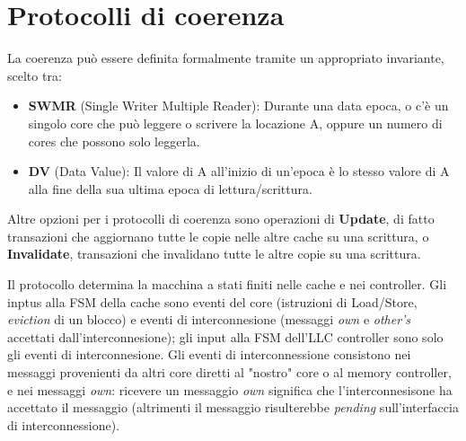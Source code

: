 \section{Protocolli di coerenza}
La coerenza può essere definita formalmente tramite un appropriato invariante, scelto tra:

\begin{itemize}
    \item \textbf{SWMR} (Single Writer Multiple Reader): Durante una data epoca, o c'è un singolo core che può leggere o scrivere la locazione A, oppure un numero di cores che possono solo leggerla.
    \item \textbf{DV} (Data Value): Il valore di A all'inizio di un'epoca è lo stesso valore di A alla fine della sua ultima epoca di lettura/scrittura. 
\end{itemize}

Altre opzioni per i protocolli di coerenza sono operazioni di \textbf{Update}, di fatto transazioni che aggiornano tutte le copie nelle altre cache su una scrittura, o \textbf{Invalidate}, transazioni che invalidano tutte le altre copie su una scrittura. 

\noindent Il protocollo determina la macchina a stati finiti nelle cache e nei controller. Gli inptus alla FSM della cache sono eventi del core (istruzioni di Load/Store, \textit{eviction} di un blocco) e eventi di interconnesione (messaggi \textit{own} e \textit{other's} accettati dall'interconnesione); gli input alla FSM dell'LLC controller sono solo gli eventi di interconnesione. Gli eventi di interconnessione consistono nei messaggi provenienti da altri core diretti al "nostro" core o al memory controller, e nei messaggi \textit{own}: ricevere un messaggio \textit{own} significa che l'interconnesisone ha accettato il messaggio (altrimenti il messaggio risulterebbe \textit{pending} sull'interfaccia di interconnessione). 

\begin{figure}[ht]
    \centering
    \setlength{\fboxrule}{0.5pt} %
    \setlength{\fboxsep}{0pt}    %
\end{figure}

